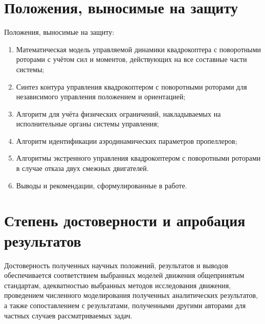 \section{Положения, выносимые на защиту}
Положения, выносимые на защиту:
\begin{enumerate}
\item Математическая модель управляемой динамики квадрокоптера с поворотными роторами с учётом сил и моментов, действующих на все составные части системы;
\item Синтез контура управления квадрокоптером с поворотными роторами для независимого управления положением и ориентацией; 
\item Алгоритм для учёта физических ограничений, накладываемых на исполнительные органы системы управления;
\item Алгоритм идентификации аэродинамических параметров пропеллеров;
\item Алгоритмы экстренного управления квадрокоптером с поворотными роторами в случае отказа двух смежных двигателей.
\item Выводы и рекомендации, сформулированные в работе.
\end{enumerate}

\section{Степень достоверности и апробация результатов}
Достоверность полученных научных положений, результатов и выводов обеспечивается
соответствием выбранных моделей движения общепринятым стандартам,
адекватностью выбранных методов исследования движения,
проведением численного моделирования полученных аналитических результатов,
а также сопоставлением с результатами,
полученными другими авторами для частных случаев рассматриваемых задач.

